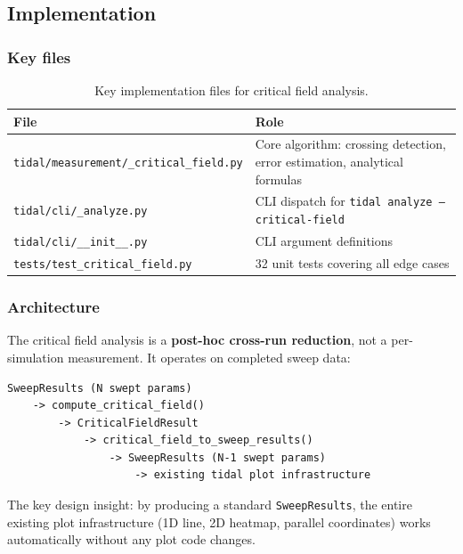 \subsection{Implementation}
\label{sec:critical-field-implementation}

\subsubsection{Key files}
\label{sec:cf-key-files}

\begin{table}[htbp]
\centering
\caption{Key implementation files for critical field analysis.}
\label{tab:cf-key-files}
\begin{tabular}{@{}ll@{}}
\toprule
File & Role \\
\midrule
\texttt{tidal/measurement/\_critical\_field.py} & Core algorithm: crossing detection, error estimation, analytical formulas \\
\texttt{tidal/cli/\_analyze.py}                 & CLI dispatch for \texttt{tidal analyze --critical-field} \\
\texttt{tidal/cli/\_\_init\_\_.py}              & CLI argument definitions \\
\texttt{tests/test\_critical\_field.py}          & 32 unit tests covering all edge cases \\
\bottomrule
\end{tabular}
\end{table}

\subsubsection{Architecture}
\label{sec:cf-architecture}

The critical field analysis is a \textbf{post-hoc cross-run reduction}, not a
per-simulation measurement. It operates on completed sweep data:

\begin{lstlisting}
SweepResults (N swept params)
    -> compute_critical_field()
        -> CriticalFieldResult
            -> critical_field_to_sweep_results()
                -> SweepResults (N-1 swept params)
                    -> existing tidal plot infrastructure
\end{lstlisting}

The key design insight: by producing a standard \texttt{SweepResults}, the entire
existing plot infrastructure (1D line, 2D heatmap, parallel coordinates)
works automatically without any plot code changes.

